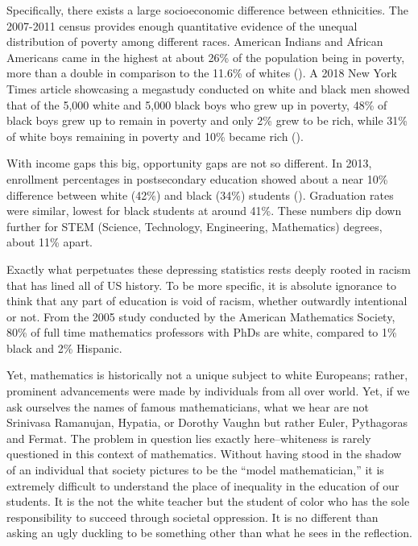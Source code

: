 Specifically, there exists a large socioeconomic difference between ethnicities. The 2007-2011 census provides enough quantitative evidence of the unequal distribution of poverty among different races. American Indians and African Americans came in the highest at about 26\% of the population being in poverty, more than a double in comparison to the 11.6\% of whites (\cite{macartney}). A 2018 New York Times article showcasing a megastudy conducted on white and black men showed that of the 5,000 white and 5,000 black boys who grew up in poverty, 48\% of black boys grew up to remain in poverty and only 2\% grew to be rich, while 31\% of white boys remaining in poverty and 10\% became rich (\cite{badger_extensive_2018}).

With income gaps this big, opportunity gaps are not so different. In 2013, enrollment percentages in postsecondary education showed about a near 10\% difference between white (42\%) and black (34\%) students (\cite{musu-gillette_status_nodate}). Graduation rates were similar, lowest for black students at around 41\%. These numbers dip down further for STEM (Science, Technology, Engineering, Mathematics) degrees, about 11\% apart.

Exactly what perpetuates these depressing statistics rests deeply rooted in racism that has lined all of US history. To be more specific, it is absolute ignorance to think that any part of education is void of racism, whether outwardly intentional or not. From the 2005 study conducted by the American Mathematics Society, 80\% of full time mathematics professors with PhDs are white, compared to 1\% black and 2\% Hispanic.

Yet, mathematics is historically not a unique subject to white Europeans; rather, prominent advancements were made by individuals from all over world. Yet, if we ask ourselves the names of famous mathematicians, what we hear are not Srinivasa Ramanujan, Hypatia, or Dorothy Vaughn but rather Euler, Pythagoras and Fermat. The problem in question lies exactly here--whiteness is rarely questioned in this context of mathematics. Without having stood in the shadow of an individual that society pictures to be the ``model mathematician,'' it is extremely difficult to understand the place of inequality in the education of our students. It is the not the white teacher but the student of color who has the sole responsibility to succeed through societal oppression. It is no different than asking an ugly duckling to be something other than what he sees in the reflection.

